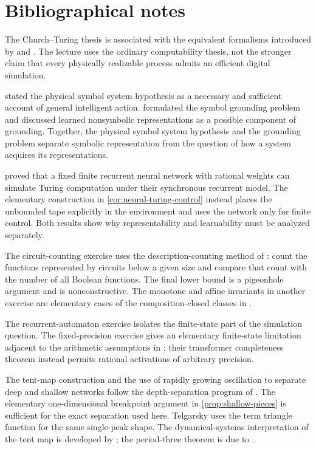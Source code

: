 \documentclass[11pt,twoside]{article}
\theoremstyle{definition}
\theoremstyle{remark}
\begin{document}
\printendnotes

\section*{Bibliographical notes}

The Church--Turing thesis is associated with the equivalent formalisms
introduced by \citet{church1936} and \citet{turing1937}. The lecture uses the
ordinary computability thesis, not the stronger claim that every physically
realizable process admits an efficient digital simulation.

\citet{newell1976} stated the physical symbol system hypothesis as a necessary
and sufficient account of general intelligent action. \citet{harnad1990}
formulated the symbol grounding problem and discussed learned nonsymbolic
representations as a possible component of grounding. Together, the physical
symbol system hypothesis and the grounding problem separate symbolic
representation from the question of how a system acquires its representations.

\citet{siegelmann1995} proved that a fixed finite recurrent neural network with
rational weights can simulate Turing computation under their synchronous
recurrent model. The elementary construction in
\cref{cor:neural-turing-control} instead places the unbounded tape explicitly
in the environment and uses the network only for finite control. Both results
show why representability and learnability must be analyzed separately.

The circuit-counting exercise uses the description-counting method of
\citet{shannon1949}: count the functions represented by circuits below a
given size and compare that count with the number of all Boolean functions.
The final lower bound is a pigeonhole argument and is nonconstructive.
The monotone and affine invariants in another exercise are elementary cases
of the composition-closed classes in \citet{post1941}.

The recurrent-automaton exercise isolates the finite-state part of the
simulation question. The fixed-precision exercise gives an elementary
finite-state limitation adjacent to the arithmetic assumptions in
\citet{perez2021}; their transformer completeness theorem instead permits
rational activations of arbitrary precision.

The tent-map construction and the use of rapidly growing oscillation to
separate deep and shallow networks follow the depth-separation program of
\citet{telgarsky2016}. The elementary one-dimensional breakpoint argument in
\cref{prop:shallow-pieces} is sufficient for the exact separation used here.
Telgarsky uses the term triangle function for the same single-peak shape.
The dynamical-systems interpretation of the tent map is developed by
\citet{alligood1997}; the period-three theorem is due to \citet{li1975}.
\end{document}
